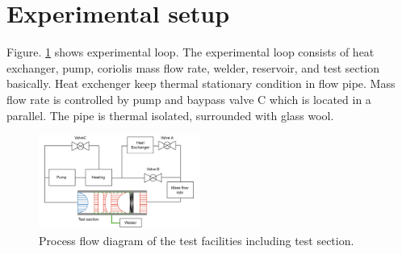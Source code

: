 \documentclass[conference]{IEEEtran}
\begin{document}
%

\section{Experimental setup}
Figure. \ref{experimental_loop} shows experimental loop.
The experimental loop consists of heat exchanger, pump, coriolis mass flow rate, welder, reservoir, and test section basically.
Heat exchenger keep thermal stationary condition in flow pipe.
Mass flow rate is controlled by pump and baypass valve C which is located in a parallel.
The pipe is thermal isolated, surrounded with glass wool.\\

\begin{figure}[htbp]
\centering
\vspace{-4zh}
\includegraphics[width=0.47\textwidth,natwidth=920,natheight=700]{fig/experimental_loop.png}
\caption{Process flow diagram of the test facilities including test section.}
\label{experimental_loop}
\end{figure}
\end{document}
